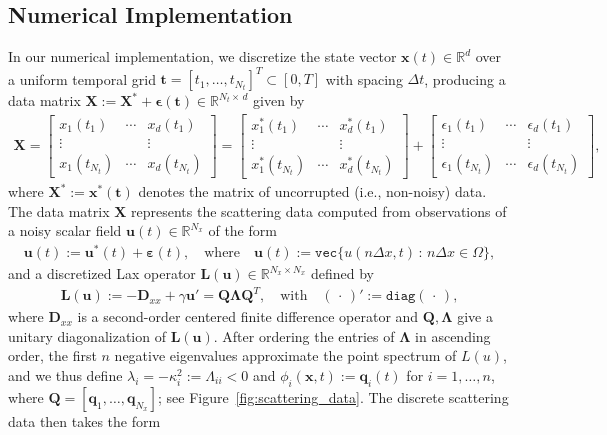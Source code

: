 \documentclass[journal=gmj]{CUP-JNL-DTM}%
\theoremstyle{definition}
\numberwithin{equation}{section}
\begin{document}
\subsection{Numerical Implementation}\label{subsec:numerical_implementation}
In our numerical implementation, we discretize the state vector $\boldsymbol{x}(t) \in \mathbb{R}^d$ over a uniform temporal grid $\mathbf{t} = [t_1, \dots, t_{N_t}]^T \subset [0,T]$ with spacing $\Delta{t}$, producing a data matrix $\mathbf{X} := \mathbf{X}^* + \boldsymbol{\epsilon}(\mathbf{t}) \in \mathbb{R}^{N_t \times \, d}$ given by \begin{align*}
    \mathbf{X}
    = \begin{bmatrix}
        x_1(t_1) & \cdots & x_d(t_1) \\
        \vdots & & \vdots \\
        x_1(t_{N_t}) & \cdots & x_d(t_{N_t})
    \end{bmatrix}
    = \begin{bmatrix}
        x^*_1(t_1) & \cdots & x^*_d(t_1) \\
        \vdots & & \vdots \\
        x^*_1(t_{N_t}) & \cdots & x^*_d(t_{N_t})
    \end{bmatrix}
    +
    \begin{bmatrix}
        \epsilon_1(t_1) & \cdots & \epsilon_d(t_1) \\
        \vdots & & \vdots \\
        \epsilon_1(t_{N_t}) & \cdots & \epsilon_d(t_{N_t})
    \end{bmatrix},
\end{align*} where $\mathbf{X}^* := \boldsymbol{x}^*(\mathbf{t})$ denotes the matrix of uncorrupted (i.e., non-noisy) data. The data matrix $\mathbf{X}$ represents the scattering data computed from observations of a noisy scalar field $\mathbf{u}(t) \in \mathbb{R}^{N_x}$ of the form \begin{align*}
    \mathbf{u}(t) := \mathbf{u}^*(t) + \boldsymbol{\varepsilon}(t),
    \quad \text{where} \quad
    \mathbf{u}(t) := \texttt{vec}\big\{u(n\Delta{x},t) \, : \, n\Delta{x} \in \Omega\big\},
\end{align*} and a discretized Lax operator $\mathbf{L}(\mathbf{u}) \in \mathbb{R}^{N_x \times N_x}$ defined by \begin{align*}
    \mathbf{L}(\mathbf{u}) := -\mathbf{D}_{xx} + \gamma\mathbf{u}' = \mathbf{Q} \mathbf{\Lambda} \mathbf{Q}^T\!,
    \quad \text{with} \quad
    (\,\cdot\,)' := \texttt{diag}(\,\cdot\,),
\end{align*} where $\mathbf{D}_{xx}$ is a second-order centered finite difference operator and $\mathbf{Q}, \mathbf{\Lambda}$ give a unitary diagonalization of $\mathbf{L}(\mathbf{u})$. After ordering the entries of $\mathbf{\Lambda}$ in ascending order, the first $n$ negative eigenvalues approximate the point spectrum of $L(u)$, and we thus define $\lambda_i = -\kappa^2_i := \Lambda_{ii} < 0$ and $\phi_i(\mathbf{x},t) := \mathbf{q}_i(t)$ for $i = 1, \dots, n$, where $\mathbf{Q} = [\mathbf{q}_1, \dots, \mathbf{q}_{N_x}]$; see Figure~\ref{fig:scattering_data}. The discrete scattering data then takes the form \begin{align*}

\end{align*}
\end{document}
